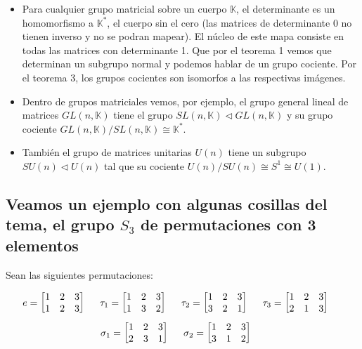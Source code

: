 \begin{itemize}
\item Para cualquier grupo matricial sobre un cuerpo $\mathds{K}$, el determinante es un homomorfismo a $\mathds{K}^*$, el cuerpo sin el cero (las matrices de determinante 0 no tienen inverso y no se podran mapear). El núcleo de este mapa consiste en todas las matrices con determinante 1. Que por el teorema 1 vemos que determinan un subgrupo normal y podemos hablar de un grupo cociente. Por el teorema 3, los grupos cocientes son isomorfos a las respectivas imágenes.

\item Dentro de grupos matriciales vemos, por ejemplo, el grupo general lineal de matrices $GL(n,\mathds{K})$ tiene el grupo $SL(n,\mathds{K}) \lhd GL(n,\mathds{K})$ y su grupo cociente $GL(n,\mathds{K})/SL(n,\mathds{K})\cong \mathds{K}^*$.

\item También el grupo de matrices unitarias $U(n)$ tiene un subgrupo $SU(n)\lhd U(n)$ tal que su cociente $U(n)/SU(n) \cong S^1 \cong U(1)$.
\end{itemize}

\subsection{Veamos un ejemplo con algunas cosillas del tema, el grupo $S_3$ de permutaciones con 3 elementos}
Sean las siguientes permutaciones:

$$e=\begin{bmatrix}
1 & 2 & 3 \\
1 & 2 & 3
\end{bmatrix} \hspace{0.5cm}
\tau_1=\begin{bmatrix}
1 & 2 & 3 \\
1 & 3 & 2
\end{bmatrix} \hspace{0.5cm}
\tau_2=\begin{bmatrix}
1 & 2 & 3 \\
3 & 2 & 1
\end{bmatrix} \hspace{0.5cm}
\tau_3=\begin{bmatrix}
1 & 2 & 3 \\
2 & 1 & 3
\end{bmatrix} \hspace{0.5cm}
$$
$$
\sigma_1=\begin{bmatrix}
1 & 2 & 3 \\
2 & 3 & 1
\end{bmatrix} \hspace{0.5cm}
\sigma_2=\begin{bmatrix}
1 & 2 & 3 \\
3 & 1 & 2
\end{bmatrix} \hspace{0.5cm}$$

